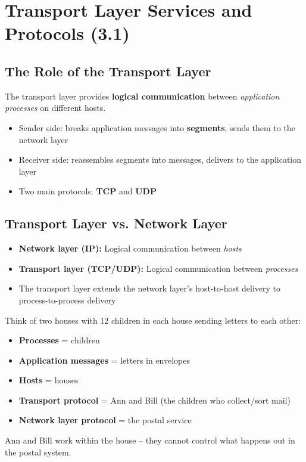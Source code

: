 \section{Transport Layer Services and Protocols (3.1)}

\subsection{The Role of the Transport Layer}

\begin{keybox}
The transport layer provides \textbf{logical communication} between \emph{application processes} on different hosts.
\begin{itemize}[noitemsep]
    \item Sender side: breaks application messages into \textbf{segments}, sends them to the network layer
    \item Receiver side: reassembles segments into messages, delivers to the application layer
    \item Two main protocols: \textbf{TCP} and \textbf{UDP}
\end{itemize}
\end{keybox}

\subsection{Transport Layer vs. Network Layer}

\begin{keybox}
\begin{itemize}[noitemsep]
    \item \textbf{Network layer (IP):} Logical communication between \emph{hosts}
    \item \textbf{Transport layer (TCP/UDP):} Logical communication between \emph{processes}
    \item The transport layer extends the network layer's host-to-host delivery to process-to-process delivery
\end{itemize}
\end{keybox}

\begin{warnbox}
Think of two houses with 12 children in each house sending letters to each other:
\begin{itemize}[noitemsep]
    \item \textbf{Processes} = children
    \item \textbf{Application messages} = letters in envelopes
    \item \textbf{Hosts} = houses
    \item \textbf{Transport protocol} = Ann and Bill (the children who collect/sort mail)
    \item \textbf{Network layer protocol} = the postal service
\end{itemize}
Ann and Bill work within the house -- they cannot control what happens out in the postal system.
\end{warnbox}

